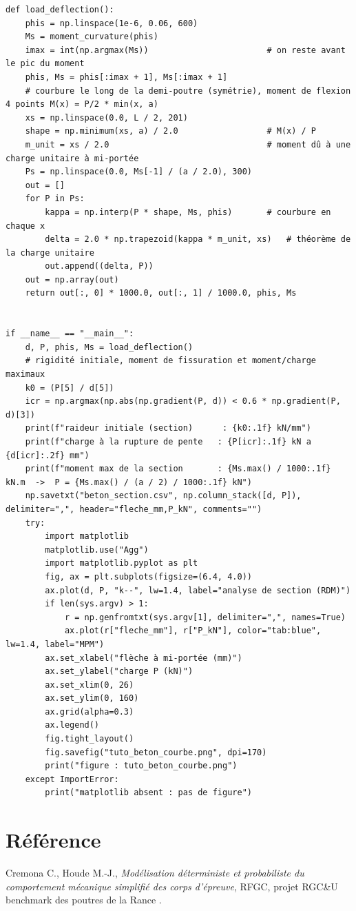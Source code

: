 \documentclass[11pt,a4paper]{article}
\begin{document}
\begin{lstlisting}
def load_deflection():
    phis = np.linspace(1e-6, 0.06, 600)
    Ms = moment_curvature(phis)
    imax = int(np.argmax(Ms))                        # on reste avant le pic du moment
    phis, Ms = phis[:imax + 1], Ms[:imax + 1]
    # courbure le long de la demi-poutre (symétrie), moment de flexion 4 points M(x) = P/2 * min(x, a)
    xs = np.linspace(0.0, L / 2, 201)
    shape = np.minimum(xs, a) / 2.0                  # M(x) / P
    m_unit = xs / 2.0                                # moment dû à une charge unitaire à mi-portée
    Ps = np.linspace(0.0, Ms[-1] / (a / 2.0), 300)
    out = []
    for P in Ps:
        kappa = np.interp(P * shape, Ms, phis)       # courbure en chaque x
        delta = 2.0 * np.trapezoid(kappa * m_unit, xs)   # théorème de la charge unitaire
        out.append((delta, P))
    out = np.array(out)
    return out[:, 0] * 1000.0, out[:, 1] / 1000.0, phis, Ms


if __name__ == "__main__":
    d, P, phis, Ms = load_deflection()
    # rigidité initiale, moment de fissuration et moment/charge maximaux
    k0 = (P[5] / d[5])
    icr = np.argmax(np.abs(np.gradient(P, d)) < 0.6 * np.gradient(P, d)[3])
    print(f"raideur initiale (section)      : {k0:.1f} kN/mm")
    print(f"charge à la rupture de pente   : {P[icr]:.1f} kN a {d[icr]:.2f} mm")
    print(f"moment max de la section       : {Ms.max() / 1000:.1f} kN.m  ->  P = {Ms.max() / (a / 2) / 1000:.1f} kN")
    np.savetxt("beton_section.csv", np.column_stack([d, P]), delimiter=",", header="fleche_mm,P_kN", comments="")
    try:
        import matplotlib
        matplotlib.use("Agg")
        import matplotlib.pyplot as plt
        fig, ax = plt.subplots(figsize=(6.4, 4.0))
        ax.plot(d, P, "k--", lw=1.4, label="analyse de section (RDM)")
        if len(sys.argv) > 1:
            r = np.genfromtxt(sys.argv[1], delimiter=",", names=True)
            ax.plot(r["fleche_mm"], r["P_kN"], color="tab:blue", lw=1.4, label="MPM")
        ax.set_xlabel("flèche à mi-portée (mm)")
        ax.set_ylabel("charge P (kN)")
        ax.set_xlim(0, 26)
        ax.set_ylim(0, 160)
        ax.grid(alpha=0.3)
        ax.legend()
        fig.tight_layout()
        fig.savefig("tuto_beton_courbe.png", dpi=170)
        print("figure : tuto_beton_courbe.png")
    except ImportError:
        print("matplotlib absent : pas de figure")
\end{lstlisting}

\section*{Référence}

Cremona C., Houde M.-J., \emph{Modélisation déterministe et probabiliste du comportement mécanique
simplifié des corps d'épreuve}, RFGC, projet RGC\&U \og benchmark des poutres de la Rance \fg{}.
\end{document}
